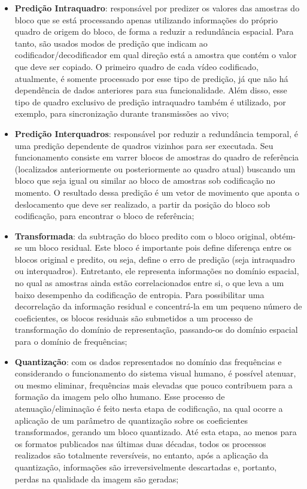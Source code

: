 \begin{itemize}
    \item \textbf{Predição Intraquadro}: responsável por predizer os valores das amostras do bloco que se está processando apenas utilizando informações do próprio quadro de origem do bloco, de forma a reduzir a redundância espacial. Para tanto, são usados modos de predição que indicam ao codificador/decodificador em qual direção está a amostra que contém o valor que deve ser copiado. O primeiro quadro de cada vídeo codificado, atualmente, é somente processado por esse tipo de predição, já que não há dependência de dados anteriores para sua funcionalidade. Além disso, esse tipo de quadro exclusivo de predição intraquadro também é utilizado, por exemplo, para sincronização durante transmissões ao vivo;

    \item \textbf{Predição Interquadros}: responsável por reduzir a redundância temporal, é uma predição dependente de quadros vizinhos para ser executada. Seu funcionamento consiste em varrer blocos de amostras do quadro de referência (localizados anteriormente ou posteriormente ao quadro atual) buscando um bloco que seja igual ou similar ao bloco de amostras sob codificação no momento. O resultado dessa predição é um vetor de movimento que aponta o deslocamento que deve ser realizado, a partir da posição do bloco sob codificação, para encontrar o bloco de referência;

    \item \textbf{Transformada}: da subtração do bloco predito com o bloco original, obtém-se um bloco residual. Este bloco é importante pois define diferença entre os blocos original e predito, ou seja, define o erro de predição (seja intraquadro ou interquadros). Entretanto, ele representa informações no domínio espacial, no qual as amostras ainda estão correlacionados entre si, o que leva a um baixo desempenho da codificação de entropia. Para possibilitar uma decorrelação da informação residual e concentrá-la em um pequeno número de coeficientes, os blocos residuais são submetidos a um processo de transformação do domínio de representação, passando-os do domínio espacial para o domínio de frequências;

    \item \textbf{Quantização}: com os dados representados no domínio das frequências e considerando o funcionamento do sistema visual humano, é possível atenuar, ou mesmo eliminar, frequências mais elevadas que pouco contribuem para a formação da imagem pelo olho humano. Esse processo de atenuação/eliminação é feito nesta etapa de codificação, na qual ocorre a aplicação de um parâmetro de quantização sobre os coeficientes transformados, gerando um bloco quantizado. Até esta etapa, ao menos para os formatos publicados nas últimas duas décadas, todos os processos realizados são totalmente reversíveis, no entanto, após a aplicação da quantização, informações são irreversivelmente descartadas e, portanto, perdas na qualidade da imagem são geradas;


\end{itemize}
